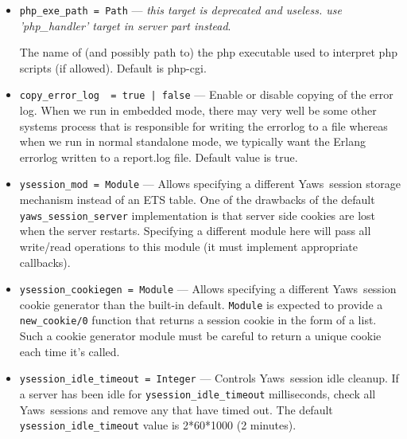 \documentclass[11pt,oneside,english]{book}
\newcommand{\Yaws}            %
        {{\sc Yaws}}
\begin{document}
\begin{itemize}
              For example, we can specify
\begin{verbatim}
  soap_srv_mods=<Mod1,Handler,WsdlFile1> <Mod2,Handler,Wsdl2,SpecifiedPrefix>
\end{verbatim}

\item        \verb+php_exe_path = Path+ ---
              \textit{this target is deprecated and useless. use 'php\_handler'
                target in server part instead}.

              The name of (and possibly path to) the php executable used to
              interpret php scripts (if allowed).  Default is php-cgi.

\item        \verb+copy_error_log  = true | false+ ---
              Enable or disable copying of the error log. When we run in
              embedded mode, there may very well be some other systems process
              that is responsible for writing the errorlog to a file whereas
              when we run in normal standalone mode, we typically want the
              Erlang errorlog written to a report.log file.  Default value is
              true.

\item        \verb+ysession_mod = Module+ ---
               Allows specifying a different \Yaws\ session storage mechanism
               instead of an ETS table. One of the drawbacks of the default
               \verb+yaws_session_server+ implementation is that server side
               cookies are lost when the server restarts. Specifying a different
               module here will pass all write/read operations to this module
               (it must implement appropriate callbacks).

\item        \verb+ysession_cookiegen = Module+ ---
               Allows specifying a different \Yaws\ session cookie
               generator than the built-in default. \verb+Module+ is
               expected to provide a \verb+new_cookie/0+ function that
               returns a session cookie in the form of a list. Such a
               cookie generator module must be careful to return a unique
               cookie each time it's called.

\item       \verb+ysession_idle_timeout = Integer+ ---
               Controls \Yaws\ session idle cleanup. If a server has been
               idle for \verb+ysession_idle_timeout+ milliseconds, check
               all \Yaws\ sessions and remove any that have timed out. The
               default \verb+ysession_idle_timeout+ value is 2*60*1000 (2
               minutes).


\end{itemize}
\end{document}
